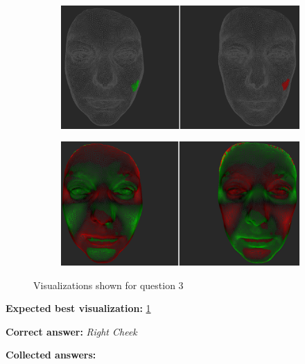 \begin{figure}[h]
\begin{subfigure}{0.4\textwidth}
\includegraphics[width=\textwidth]{./screenshots/pair5.PNG}
\caption{}
\label{fig:study-2-5}
\end{subfigure}
\quad
\begin{subfigure}{0.4\textwidth}
\includegraphics[width=\textwidth]{./screenshots/pair7.PNG}
\caption{}
\label{fig:study-2-7}
\end{subfigure}
\caption{Visualizations shown for question 3}
\end{figure}
\medskip

{\bf Expected best visualization:} \ref{fig:study-2-5}
\medskip

{\bf Correct answer:} {\it Right Cheek}
\medskip

{\bf Collected answers:}

